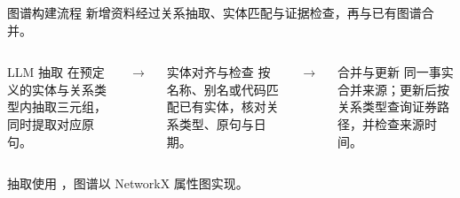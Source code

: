 \begin{frame}{图谱构建流程}\relax
新增资料经过关系抽取、实体匹配与证据检查，再与已有图谱合并。
\par\vspace{2mm}
\begin{columns}[T,onlytextwidth]
\begin{block}{LLM 抽取}
在预定义的实体与关系类型内抽取三元组，同时提取对应原句。
\end{block}
\centering\vspace{16mm}$\rightarrow$
\begin{block}{实体对齐与检查}
按名称、别名或代码匹配已有实体，核对关系类型、原句与日期。
\end{block}
\centering\vspace{16mm}$\rightarrow$
\begin{block}{合并与更新}
同一事实合并来源；更新后按关系类型查询证券路径，并检查来源时间。
\end{block}
\end{columns}
\par\vspace{3mm}
抽取使用 \LiveModelName{}，图谱以 NetworkX 属性图实现。
\end{frame}
